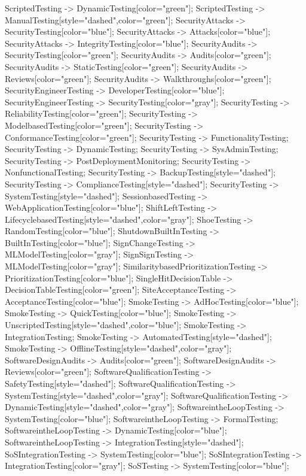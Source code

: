 \documentclass{article}
\begin{document}
{ScriptedTesting -> DynamicTesting[color="green"];
ScriptedTesting -> ManualTesting[style="dashed",color="green"];
SecurityAttacks -> SecurityTesting[color="blue"];
SecurityAttacks -> Attacks[color="blue"];
SecurityAttacks -> IntegrityTesting[color="blue"];
SecurityAudits -> SecurityTesting[color="green"];
SecurityAudits -> Audits[color="green"];
SecurityAudits -> StaticTesting[color="green"];
SecurityAudits -> Reviews[color="green"];
SecurityAudits -> Walkthroughs[color="green"];
SecurityEngineerTesting -> DeveloperTesting[color="blue"];
SecurityEngineerTesting -> SecurityTesting[color="gray"];
SecurityTesting -> ReliabilityTesting[color="green"];
SecurityTesting -> ModelbasedTesting[color="green"];
SecurityTesting -> ConformanceTesting[color="green"];
SecurityTesting -> FunctionalityTesting;
SecurityTesting -> DynamicTesting;
SecurityTesting -> SysAdminTesting;
SecurityTesting -> PostDeploymentMonitoring;
SecurityTesting -> NonfunctionalTesting;
SecurityTesting -> BackupTesting[style="dashed"];
SecurityTesting -> ComplianceTesting[style="dashed"];
SecurityTesting -> SystemTesting[style="dashed"];
SessionbasedTesting -> WebApplicationTesting[color="blue"];
ShiftLeftTesting -> LifecyclebasedTesting[style="dashed",color="gray"];
ShoeTesting -> RandomTesting[color="blue"];
ShutdownBuiltInTesting -> BuiltInTesting[color="blue"];
SignChangeTesting -> MLModelTesting[color="gray"];
SignSignTesting -> MLModelTesting[color="gray"];
SimilaritybasedPrioritizationTesting -> PrioritizationTesting[color="blue"];
SingleHitDecisionTable -> DecisionTableTesting[color="green"];
SiteAcceptanceTesting -> AcceptanceTesting[color="blue"];
SmokeTesting -> AdHocTesting[color="blue"];
SmokeTesting -> QuickTesting[color="blue"];
SmokeTesting -> UnscriptedTesting[style="dashed",color="blue"];
SmokeTesting -> IntegrationTesting;
SmokeTesting -> AutomatedTesting[style="dashed"];
SmokeTesting -> OfflineTesting[style="dashed",color="gray"];
SoftwareDesignAudits -> Audits[color="green"];
SoftwareDesignAudits -> Reviews[color="green"];
SoftwareQualificationTesting -> SafetyTesting[style="dashed"];
SoftwareQualificationTesting -> SystemTesting[style="dashed",color="gray"];
SoftwareQualificationTesting -> DynamicTesting[style="dashed",color="gray"];
SoftwareintheLoopTesting -> SystemTesting[color="blue"];
SoftwareintheLoopTesting -> FormalTesting;
SoftwareintheLoopTesting -> DynamicTesting[color="blue"];
SoftwareintheLoopTesting -> IntegrationTesting[style="dashed"];
SoSIntegrationTesting -> SystemTesting[color="blue"];
SoSIntegrationTesting -> IntegrationTesting[color="gray"];
SoSTesting -> SystemTesting[color="blue"];
}
\end{document}
